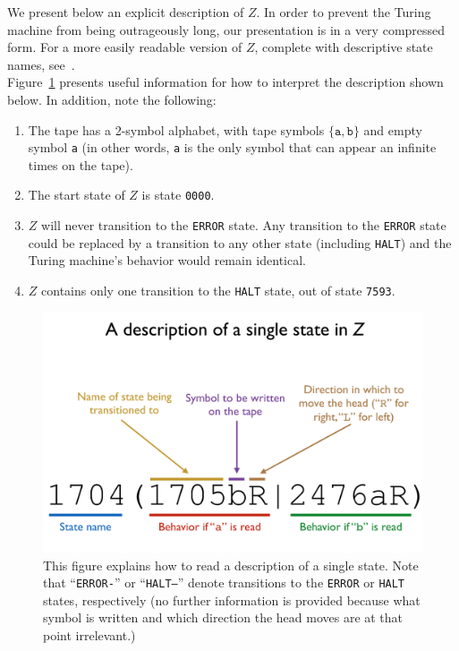\documentclass[11pt]{article}
\newcommand{\zhaltstate}{\texttt{7593}}
\begin{document}
\begin{appendices}
We present below an explicit description of $Z$. In order to prevent the Turing machine from being outrageously long, our presentation is in a very compressed form. For a more easily readable version of $Z$, complete with descriptive state names, see~\cite{github}. \\

Figure~\ref{fig:syntax} presents useful information for how to interpret the description shown below. In addition, note the following:

\begin{enumerate}

\item The tape has a 2-symbol alphabet, with tape symbols $\{\texttt{a}, \texttt{b}\}$ and empty symbol \texttt{a} (in other words, \texttt{a} is the only symbol that can appear an infinite times on the tape).
\item The start state of $Z$ is state \texttt{0000}.
\item $Z$ will never transition to the \texttt{ERROR} state. Any transition to the \texttt{ERROR} state could be replaced by a transition to any other state (including \texttt{HALT}) and the Turing machine's behavior would remain identical.
\item $Z$ contains only one transition to the \texttt{HALT} state, out of state \zhaltstate.

\end{enumerate}

\begin{figure} 
\begin{center} 
\includegraphics[scale=0.4]{figs/syntax.png}
\caption{This figure explains how to read a description of a single state. Note that ``\texttt{ERROR-}'' or ``\texttt{HALT--}'' denote transitions to the \texttt{ERROR} or \texttt{HALT} states, respectively (no further information is provided because what symbol is written and which direction the head moves are at that point irrelevant.) \label{fig:syntax}} 
\end{center} 
\end{figure}

\clearpage


\end{appendices}
\end{document}

